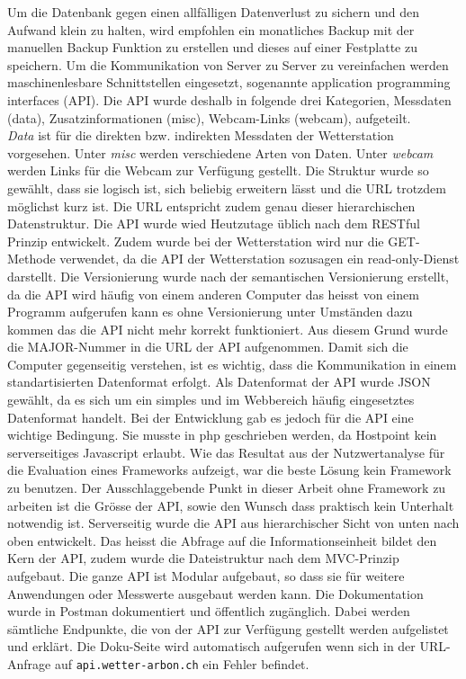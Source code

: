 \documentclass[10pt]{article}
\begin{document}
\begin{multicols}{2}
Um die Datenbank gegen einen allfälligen Datenverlust zu sichern und den Aufwand klein zu halten, wird empfohlen ein monatliches Backup mit der manuellen Backup Funktion zu erstellen und dieses auf einer Festplatte zu speichern.
Um die Kommunikation von Server zu Server zu vereinfachen werden maschinenlesbare Schnittstellen eingesetzt, sogenannte application programming interfaces (API). Die API wurde deshalb in folgende drei Kategorien, Messdaten (data), Zusatzinformationen (misc), Webcam-Links (webcam), aufgeteilt.\\
\emph{Data} ist für die direkten bzw. indirekten Messdaten der Wetterstation vorgesehen. Unter \emph{misc} werden verschiedene Arten von Daten. Unter \emph{webcam} werden Links für die Webcam zur Verfügung gestellt. Die Struktur wurde so gewählt, dass sie logisch ist, sich beliebig erweitern lässt und die URL trotzdem möglichst kurz ist. Die URL entspricht zudem genau dieser hierarchischen Datenstruktur. Die API wurde wied Heutzutage üblich nach dem RESTful Prinzip entwickelt. Zudem wurde bei  der Wetterstation wird nur die GET-Methode verwendet, da die API der Wetterstation sozusagen ein read-only-Dienst darstellt. Die Versionierung wurde nach der semantischen Versionierung erstellt, da die API wird häufig von einem anderen Computer das heisst von einem Programm aufgerufen kann es ohne Versionierung unter Umständen dazu kommen das die API nicht mehr korrekt funktioniert. Aus diesem Grund wurde die MAJOR-Nummer in die URL der API aufgenommen. Damit sich die Computer gegenseitig verstehen, ist es wichtig, dass die Kommunikation in einem standartisierten Datenformat erfolgt. Als Datenformat der API wurde JSON gewählt, da es sich um ein simples und im Webbereich häufig eingesetztes Datenformat handelt. Bei der Entwicklung gab es jedoch für die API eine wichtige Bedingung. Sie musste in php geschrieben werden, da Hostpoint kein serverseitiges Javascript erlaubt.  Wie das Resultat aus der Nutzwertanalyse für die Evaluation eines Frameworks aufzeigt, war die beste Lösung kein Framework zu benutzen. Der Ausschlaggebende Punkt in dieser Arbeit ohne Framework zu arbeiten ist die Grösse der API, sowie den Wunsch dass praktisch kein Unterhalt notwendig ist. Serverseitig wurde die API aus hierarchischer Sicht von unten nach oben entwickelt. Das heisst die Abfrage auf die Informationseinheit bildet den Kern der API, zudem wurde die Dateistruktur nach dem MVC-Prinzip aufgebaut. Die ganze API ist Modular aufgebaut, so dass sie für weitere Anwendungen oder Messwerte ausgebaut werden kann. Die Dokumentation wurde in Postman dokumentiert und öffentlich zugänglich.  Dabei werden sämtliche Endpunkte, die von der API zur Verfügung gestellt werden aufgelistet und erklärt. Die Doku-Seite wird automatisch aufgerufen wenn sich in der URL-Anfrage auf \texttt{api.wetter-arbon.ch} ein Fehler befindet.\\


\end{multicols}
\end{document}
